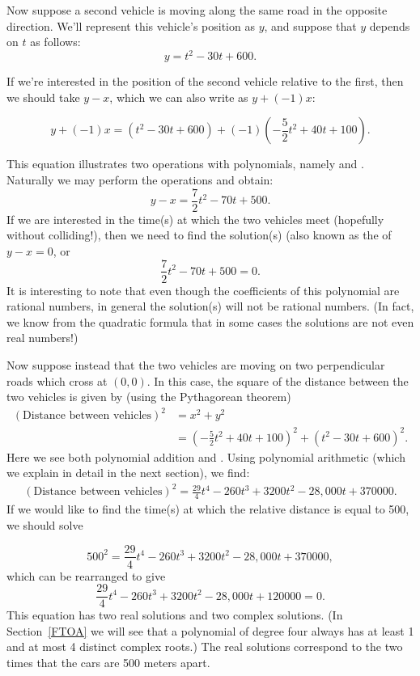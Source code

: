 Now suppose a second vehicle is moving along the same road  in the opposite direction. We'll represent this vehicle's position as $y$, and suppose that $y$ depends on $t$ as follows:
$$ y =   t^2- 30t + 600.$$

If we're interested in the position of the second vehicle relative to the first, then we should take $y - x$, which we can also write as $y + (-1)x$:

$$ y + (-1)x =  (t^2- 30t + 600) + (-1)(-\frac{5}{2} t^2+ 40t + 100).$$

This equation illustrates two operations with polynomials, namely  and .  Naturally we may perform the operations and obtain:
$$ y -x =  \frac{7}{2} t^2- 70t + 500.$$
If we are interested in the time(s) at which the two vehicles meet (hopefully without colliding!), then we need to find the solution(s) (also known as the  of  $y-x = 0$, or
$$   \frac{7}{2} t^2 - 70t + 500 = 0.$$
It is interesting to note that even though the coefficients of this polynomial are rational numbers, in general the solution(s) will not be rational numbers. (In fact, we know from the quadratic formula that in some cases the solutions are not even real numbers!)

Now suppose instead that the two vehicles are moving on two perpendicular roads which cross at $(0,0)$.  In this case, the square of the distance between the two vehicles is given by (using the Pythagorean theorem)
\begin{align*}
(\text{Distance between vehicles})^2 &= x^2 + y^2 \\
&= (-\frac{5}{2} t^2+ 40t + 100)^2 + (t^2- 30t + 600)^2.
\end{align*}
Here we see both polynomial addition and . Using polynomial arithmetic (which we explain in detail in the next section), we find:
\begin{align*}
(\text{Distance between vehicles})^2 = \frac{29}{4}t^4 - 260t^3+3200t^2-28,000t+370000.
\end{align*}
If we would like to find the time(s) at which the relative distance is equal to 500, we should solve

$$500^2 = \frac{29}{4}t^4 - 260t^3+3200t^2-28,000t+370000, $$
which can be rearranged to give
$$ \frac{29}{4}t^4 - 260t^3+3200t^2-28,000t+120000=0.$$
This equation has two real solutions and two complex solutions. (In Section~\ref{FTOA} we will see that a  polynomial of degree four always has at least 1 and at most 4 distinct complex roots.) The real solutions correspond to the two times that the cars are 500 meters apart. 
  
